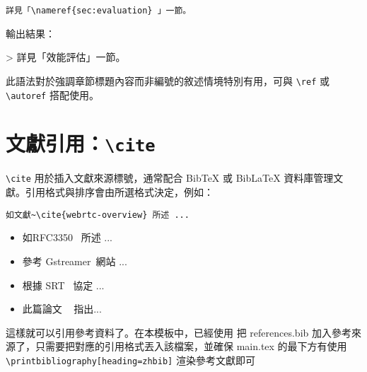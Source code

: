 \begin{verbatim}
詳見「\nameref{sec:evaluation} 」一節。
\end{verbatim}

輸出結果：

> 詳見「效能評估」一節。

此語法對於強調章節標題內容而非編號的敘述情境特別有用，可與 \verb|\ref| 或 \verb|\autoref| 搭配使用。

\section{文獻引用：\texttt{\textbackslash cite}}

\verb|\cite| 用於插入文獻來源標號，通常配合 BibTeX 或 BibLaTeX 資料庫管理文獻。引用格式與排序會由所選格式決定，例如：

\begin{verbatim}
如文獻~\cite{webrtc-overview} 所述 ...
\end{verbatim}

\begin{itemize}
\item 如RFC3350~\cite{rfc3550} 所述 ...
\item 參考 Gstreamer~\cite{gstreamer-gitlab}網站 ...
\item 根據 SRT~\cite{srt-protocol} 協定 ...
\item 此篇論文 ~\cite{hoang2018dynamic} 指出...
\end{itemize}

這樣就可以引用參考資料了。在本模板中，已經使用 \verb|| 把 references.bib 加入參考來源了，只需要把對應的引用格式丟入該檔案，並確保 main.tex 的最下方有使用 \verb|\printbibliography[heading=zhbib]| 渲染參考文獻即可